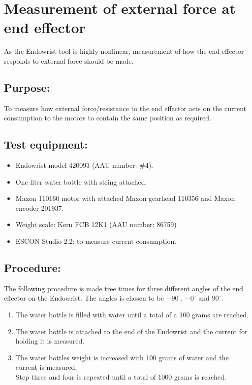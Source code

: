 \section{Measurement of external force at end effector} %

As the Endowrist tool is highly nonlinear, measurement of how the end effector responds to external force should be made.

\subsection*{Purpose:}
To measure how external force/resistance to the end effector acts on the current consumption to the motors to contain the same position as required.

\subsection*{Test equipment:}
\begin{itemize}
\item Endowrist model 420093 (AAU number: \#4).
\item One liter water bottle with string attached.
\item Maxon 110160 motor with attached Maxon gearhead 110356 and Maxon encoder 201937.
\item Weight scale: Kern FCB 12K1 (AAU number: 86759)
\item ESCON Studio 2.2: to measure current consumption.
\end{itemize}

\subsection*{Procedure:}
The following procedure is made tree times for three different angles of the end effector on the Endowrist. The angles is chosen to be $-90^\circ$, $-0^\circ$ and $90^\circ$.
\begin{enumerate}
\item The water bottle is filled with water until a total of a 100 grams are reached. 
\item The water bottle is attached to the end of the Endowrist and the current for holding it is measured.
\item The water bottles weight is increased with 100 grams of water and the current is measured.\\
Step three and four is repeated until a total of 1000 grams is reached.


\end{enumerate}

